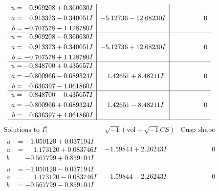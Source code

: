 \documentclass[1p]{elsarticle_modified}
\theoremstyle{definition}
\newcommand{\I}{\sqrt{-1}}
\begin{document}
$$\begin{array}{c|c|c}
\begin{aligned}
u &= \phantom{-}0.969208 + 0.360630 I \\
a &= \phantom{-}0.913373 - 0.340051 I \\
b &= -0.707578 - 1.128780 I\end{aligned}
 & -5.12736 - 12.68230 I & \phantom{-0.000000 } 0 \\ \hline\begin{aligned}
u &= \phantom{-}0.969208 - 0.360630 I \\
a &= \phantom{-}0.913373 + 0.340051 I \\
b &= -0.707578 + 1.128780 I\end{aligned}
 & -5.12736 + 12.68230 I & \phantom{-0.000000 } 0 \\ \hline\begin{aligned}
u &= -0.848700 + 0.435657 I \\
a &= -0.800966 - 0.689324 I \\
b &= \phantom{-}0.636397 - 1.061860 I\end{aligned}
 & \phantom{-}1.42651 + 8.48211 I & \phantom{-0.000000 } 0 \\ \hline\begin{aligned}
u &= -0.848700 - 0.435657 I \\
a &= -0.800966 + 0.689324 I \\
b &= \phantom{-}0.636397 + 1.061860 I\end{aligned}
 & \phantom{-}1.42651 - 8.48211 I & \phantom{-0.000000 } 0\\
 \hline 
 \end{array}$$\newpage$$\begin{array}{c|c|c}  
\text{Solutions to }I^u_{1}& \I (\text{vol} + \sqrt{-1}CS) & \text{Cusp shape}\\
 \hline 
\begin{aligned}
u &= -1.050120 + 0.037194 I \\
a &= \phantom{-}1.173120 + 0.083746 I \\
b &= -0.567799 + 0.859104 I\end{aligned}
 & -1.59844 + 2.26243 I & \phantom{-0.000000 } 0 \\ \hline\begin{aligned}
u &= -1.050120 - 0.037194 I \\
a &= \phantom{-}1.173120 - 0.083746 I \\
b &= -0.567799 - 0.859104 I\end{aligned}
 & -1.59844 - 2.26243 I & \phantom{-0.000000 } 0 \\ \hline\begin{aligned}

\end{aligned}
\end{array}$$
\end{document}
